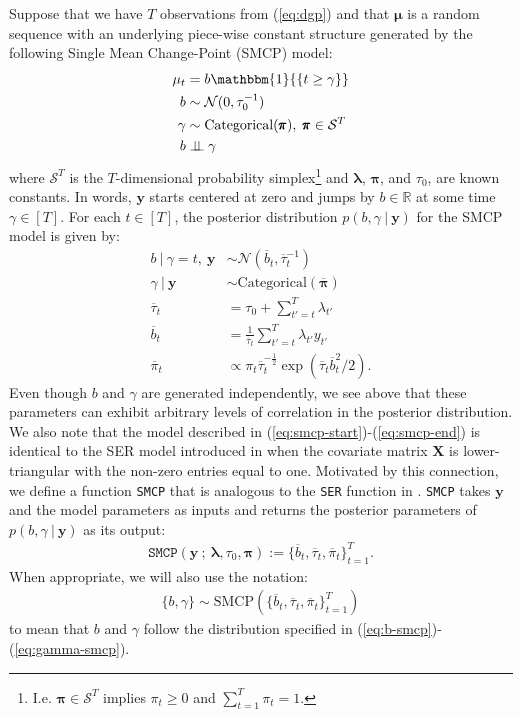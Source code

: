 Suppose that we have $T$ observations from (\ref{eq:dgp}) and that $\pmb{\mu}$ is a random sequence with an underlying piece-wise constant structure generated by the following Single Mean Change-Point (SMCP) model:
\begin{align} \label{eq:smcp-start}
    \mu_t &= b\mathbbm{1}{\left\{t\geq \gamma \right\}} \\
    b &\sim \mathcal{N}(0,\tau_0^{-1}) \\
    \gamma &\sim \text{Categorical}(\pmb{\pi}),\; \pmb{\pi} \in \mathcal{S}^T \\
    b &\indep \gamma
    \label{eq:smcp-end}
\end{align}
where $\mathcal{S}^T$ is the $T$-dimensional probability simplex\footnote{I.e. $\pmb{\pi} \in \mathcal{S}^T$ implies $\pi_t \geq 0$ and $\sum_{t=1}^T \pi_t = 1$.} and $\pmb{\lambda}$, $\pmb{\pi}$, and $\tau_0$, are known constants. In words, $\mathbf{y}$ starts centered at zero and jumps by $b\in\mathbb{R}$ at some time $\gamma \in [T]$. For each $t \in [T]$, the posterior distribution $p(b, \gamma \:|\: \mathbf{y})$ for the SMCP model is given by:
\begin{align}
    b \:|\: \gamma = t, \: \mathbf{y} &\sim \mathcal{N}\left(\overline{b}_{t}, \overline{\tau}_{t}^{-1}\right) \label{eq:b-smcp} \\
    \gamma \:|\: \mathbf{y} &\sim \text{Categorical}(\overline{\pmb{\pi}}) \label{eq:gamma-smcp} \\
    \overline{\tau}_t &= \tau_0 + \sum_{t'=t}^{T} \lambda_{t'} \\
    \overline{b}_t &= \frac{1}{\overline{\tau}_t}\sum_{t'=t}^{T} \lambda_{t'} y_{t'} \\
    \overline{\pi}_t &\propto \pi_t\overline{\tau}^{-\frac{1}{2}}_t\exp\left(\overline{\tau}_t\overline{b}^2_t / 2\right).
\end{align}
Even though $b$ and $\gamma$ are generated independently, we see above that these parameters can exhibit arbitrary levels of correlation in the posterior distribution. We also note that the model described in (\ref{eq:smcp-start})-(\ref{eq:smcp-end}) is identical to the SER model introduced in \cite{Wang20} when the covariate matrix $\mathbf{X}$ is lower-triangular with the non-zero entries equal to one. Motivated by this connection, we define a function \texttt{SMCP} that is analogous to the \texttt{SER} function in \cite{Wang20}. \texttt{SMCP} takes $\mathbf{y}$ and the model parameters as inputs and returns the posterior parameters of $p(b, \gamma\:|\:\mathbf{y})$ as its output: 
\begin{align}\label{eq:smcp}
    \texttt{SMCP}\left(\mathbf{y} \:;\: \pmb{\lambda}, \tau_0, \pmb{\pi}\right) := \{\overline{b}_t, \overline{\tau}_t, \overline{\pi}_t\}_{t=1}^T.
\end{align}
When appropriate, we will also use the notation:
\begin{align}
    \{b,\gamma\} \sim \text{SMCP}(\{\overline{b}_t, \overline{\tau}_t, \overline{\pi}_t\}_{t=1}^T)
\end{align}
to mean that $b$ and $\gamma$ follow the distribution specified in (\ref{eq:b-smcp})-(\ref{eq:gamma-smcp}).

